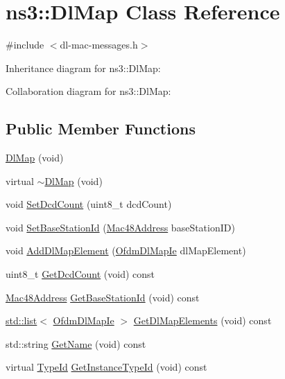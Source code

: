 \hypertarget{classns3_1_1DlMap}{}\section{ns3\+:\+:Dl\+Map Class Reference}
\label{classns3_1_1DlMap}


{\ttfamily \#include $<$dl-\/mac-\/messages.\+h$>$}



Inheritance diagram for ns3\+:\+:Dl\+Map\+:


Collaboration diagram for ns3\+:\+:Dl\+Map\+:
\subsection*{Public Member Functions}
\begin{DoxyCompactItemize}
\item 
\hyperlink{classns3_1_1DlMap_a72a84899fb92fa62a5a7fea1d5680dee}{Dl\+Map} (void)
\item 
virtual \hyperlink{classns3_1_1DlMap_aa600437ef404cb298fd6dd9561367c18}{$\sim$\+Dl\+Map} (void)
\item 
void \hyperlink{classns3_1_1DlMap_a07d522f75a07cc181f9fc9fc4c567704}{Set\+Dcd\+Count} (uint8\+\_\+t dcd\+Count)
\item 
void \hyperlink{classns3_1_1DlMap_a4951212c10a7146436b365ab9a539c53}{Set\+Base\+Station\+Id} (\hyperlink{classns3_1_1Mac48Address}{Mac48\+Address} base\+Station\+ID)
\item 
void \hyperlink{classns3_1_1DlMap_a169be40fb4ee59c8ac8ee601974440c6}{Add\+Dl\+Map\+Element} (\hyperlink{classns3_1_1OfdmDlMapIe}{Ofdm\+Dl\+Map\+Ie} dl\+Map\+Element)
\item 
uint8\+\_\+t \hyperlink{classns3_1_1DlMap_a2e6df9086e1e20b629d11d334a6d176d}{Get\+Dcd\+Count} (void) const 
\item 
\hyperlink{classns3_1_1Mac48Address}{Mac48\+Address} \hyperlink{classns3_1_1DlMap_a5ed8d638844df17a1a106e8bda9eb87c}{Get\+Base\+Station\+Id} (void) const 
\item 
\hyperlink{openflow-interface_8h_afd9bcfa176617760671b67580f536fa7}{std\+::list}$<$ \hyperlink{classns3_1_1OfdmDlMapIe}{Ofdm\+Dl\+Map\+Ie} $>$ \hyperlink{classns3_1_1DlMap_aada11698cbe17b6b0d6440f2fffb3c2d}{Get\+Dl\+Map\+Elements} (void) const 
\item 
std\+::string \hyperlink{classns3_1_1DlMap_a79310e553913cba963d9e45d2be4f0f4}{Get\+Name} (void) const 
\item 
virtual \hyperlink{classns3_1_1TypeId}{Type\+Id} \hyperlink{classns3_1_1DlMap_ad27c1e88712a13880322a2ee6a50c97b}{Get\+Instance\+Type\+Id} (void) const 

\end{DoxyCompactItemize}
